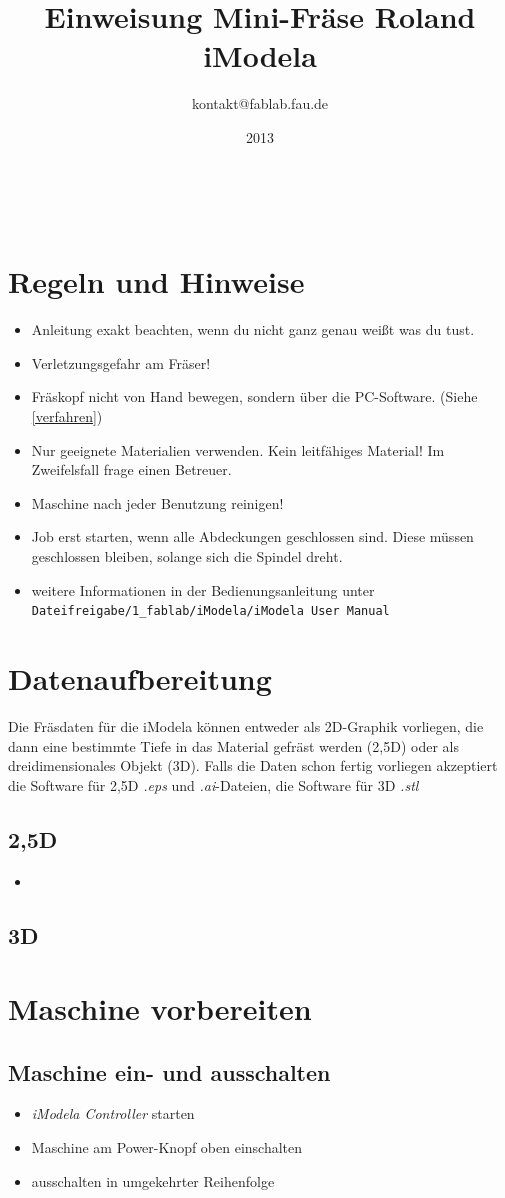 \documentclass{\basedir/fablab-document}
\date{2013}
\author{kontakt@fablab.fau.de}
\title{Einweisung Mini-Fräse Roland iModela}
\begin{document}
~
\section{Regeln und Hinweise}
\begin{itemize}
\item Anleitung exakt beachten, wenn du nicht ganz genau weißt was du
tust.
\item Verletzungsgefahr am Fräser!
\item Fräskopf nicht von Hand bewegen, sondern über die PC-Software. (Siehe \ref{verfahren})
\item Nur geeignete Materialien verwenden. Kein leitfähiges Material! Im Zweifelsfall frage einen Betreuer.
\item Maschine nach jeder Benutzung reinigen!
\item Job erst starten, wenn alle Abdeckungen geschlossen sind. Diese müssen geschlossen bleiben, solange sich die Spindel dreht.
\item weitere Informationen in der Bedienungsanleitung unter\\ \texttt{Dateifreigabe/1\_fablab/iModela/iModela User Manual}
\end{itemize}
\section{Datenaufbereitung}
Die Fräsdaten für die iModela können entweder als 2D-Graphik vorliegen, die dann eine bestimmte Tiefe in das Material gefräst werden (2,5D) oder als dreidimensionales Objekt (3D). Falls die Daten schon fertig vorliegen akzeptiert die Software für 2,5D \emph{.eps} und \emph{.ai}-Dateien, die Software für 3D \emph{.stl} 
\subsection{2,5D}
\begin{itemize}
\item {}
\end{itemize}

\subsection{3D}

\section{Maschine vorbereiten}
\subsection{Maschine ein- und ausschalten}
\begin{itemize}
	\item \emph{iModela Controller} starten 
	\item Maschine am Power-Knopf oben einschalten 
	\item ausschalten in umgekehrter Reihenfolge
\end{itemize}
\end{document}
